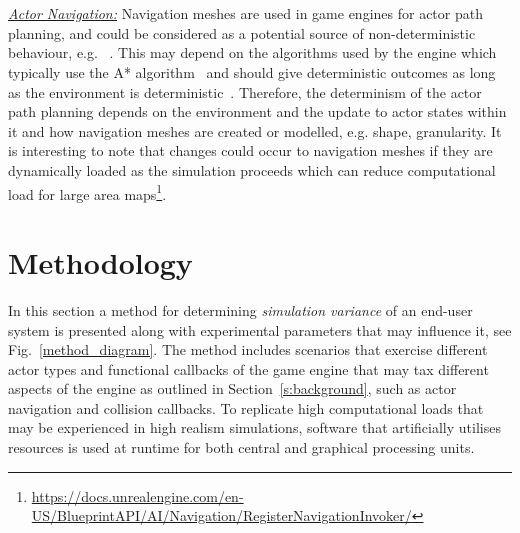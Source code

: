 \documentclass[letterpaper, 10 pt, journal, twoside]{IEEEtran}
\begin{document}
\\\\
\noindent\underline{\textit{Actor Navigation:}}
Navigation meshes are used in game engines for actor path planning, and could be considered as a potential source of non-deterministic behaviour, e.g.%
~\cite{CARLABenchmark}. 
This may depend on the algorithms used by the engine which typically use the A* algorithm~\cite{AStarBook} and should give deterministic outcomes as long as the environment is deterministic~\cite{AirsimUnrealArticle}\cite{UnrealAIDocumentation}. 
Therefore, the determinism of the actor path planning depends on the environment and the update to actor states within it and how navigation meshes are created or modelled, e.g. shape, granularity. 
%
It is interesting to note that changes could occur to navigation meshes if they are dynamically loaded as the simulation proceeds which can reduce computational load for large area maps\footnote{\url{https://docs.unrealengine.com/en-US/BlueprintAPI/AI/Navigation/RegisterNavigationInvoker/}}.


\section{Methodology} \label{s:methodology}
In this section a method for determining \textit{simulation variance} of an end-user system is presented along with experimental parameters that may influence it, see Fig.~\ref{method_diagram}. The method includes scenarios that exercise different actor types and functional callbacks of the game engine that may tax different aspects of the engine as outlined in Section~\ref{s:background}, such as actor navigation and collision callbacks. To replicate high computational loads that may be experienced in high realism simulations, software that artificially utilises resources is used at runtime for both central and graphical processing units. 
\end{document}
